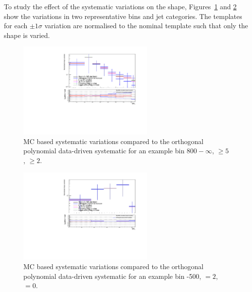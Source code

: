 To study the effect of the systematic variations on the \mht shape, 
Figures~\ref{fig:mcCompLow} and \ref{fig:mcCompHigh} show the \mht variations in two representative \scalht 
bins and jet categories. The templates for each $\pm 1 \sigma$ variation are normalised to the
nominal template such that only the shape is varied.

\begin{figure}[h!]
  \centering
  \includegraphics[width=0.6\textwidth]{Figures/backgroundPrediction/mcComparison6fb/totalSMS-T1tttt_mGluino-1000_mLSP-100_25ns_mht_ge5j_ge3b_800.pdf}
  \caption{\label{fig:mcCompLow} MC based systematic variations compared to the orthogonal 
  polynomial data-driven systematic for an example bin \scalht $800-\infty$, \njet $\geq 5$, \nb $\geq 2$.}
\end{figure}
\begin{figure}[h!]
  \centering
  \includegraphics[width=0.6\textwidth]{Figures/backgroundPrediction/mcComparison6fb/totalSMS-T1tttt_mGluino-1000_mLSP-100_25ns_mht_eq2j_eq0b_400.pdf}
  \caption{\label{fig:mcCompHigh} MC based systematic variations compared to the 
orthogonal polynomial data-driven systematic for an example bin -500, \njet $= 2$, \nb $= 0$.}
\end{figure}



